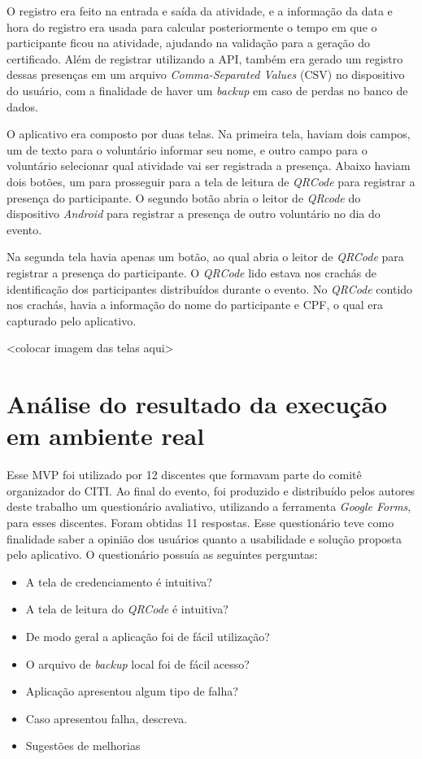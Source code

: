 O registro era feito na entrada e saída da atividade, e a informação da data e hora do registro era usada para calcular posteriormente o tempo em que o participante ficou na atividade, ajudando na validação para a geração do certificado. Além de registrar utilizando a API, também era gerado um registro dessas presenças em um arquivo \textit{Comma-Separated Values} (CSV) no dispositivo do usuário, com a finalidade de haver um \textit{backup} em caso de perdas no banco de dados.

O aplicativo era composto por duas telas. Na primeira tela, haviam dois campos, um de texto para o voluntário informar seu nome, e outro campo para o voluntário selecionar qual atividade vai ser registrada a presença. Abaixo haviam dois botões, um para prosseguir para a tela de leitura de \textit{QRCode} para registrar a presença do participante. O segundo botão abria o leitor de \textit{QRcode} do dispositivo \textit{Android} para registrar a presença de outro voluntário no dia do evento.

Na segunda tela havia apenas um botão, ao qual abria o leitor de \textit{QRCode} para registrar a presença do participante. O \textit{QRCode} lido estava nos crachás de identificação dos participantes distribuídos durante o evento. No \textit{QRCode} contido nos crachás, havia a informação do nome do participante e CPF, o qual era capturado pelo aplicativo.

<colocar imagem das telas aqui>

\section{Análise do resultado da execução em ambiente real}

Esse MVP foi utilizado por 12 discentes que formavam parte do comitê organizador do CITI. Ao final do evento, foi produzido e distribuído pelos autores deste trabalho um questionário avaliativo, utilizando a ferramenta \textit{Google Forms}, para esses discentes. Foram obtidas 11 respostas. Esse questionário teve como finalidade saber a opinião dos usuários quanto a usabilidade e solução proposta pelo aplicativo. O questionário possuía as seguintes perguntas:

\begin{itemize}
    \item A tela de credenciamento é intuitiva?
    \item A tela de leitura do \textit{QRCode} é intuitiva?
    \item De modo geral a aplicação foi de fácil utilização?
    \item O arquivo de \textit{backup} local foi de fácil acesso?
    \item Aplicação apresentou algum tipo de falha?
    \item Caso apresentou falha, descreva.
    \item Sugestões de melhorias
\end{itemize}

